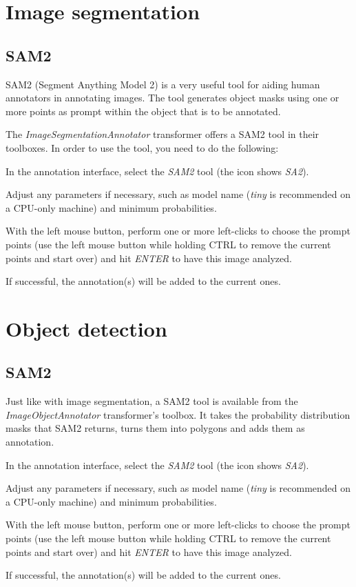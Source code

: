 \documentclass[a4paper]{book}
\begin{document}
\chapter{Image segmentation}
\section{SAM2}
SAM2\cite{sam2} (Segment Anything Model 2) is a very useful tool for aiding human annotators in
annotating images. The tool generates object masks using one or more points as prompt
within the object that is to be annotated.

The \textit{ImageSegmentationAnnotator} transformer offers a SAM2
tool in their toolboxes. In order to use the tool, you need to do the following:

\begin{tight_itemize}
  \item In the annotation interface, select the \textit{SAM2} tool (the icon shows \textit{SA2}).
  \item Adjust any parameters if necessary, such as model name (\textit{tiny} is recommended on a CPU-only machine)
  and minimum probabilities.
  \item With the left mouse button, perform one or more left-clicks to choose the prompt points (use the left mouse
  button while holding CTRL to remove the current points and start over) and hit \textit{ENTER} to have this image analyzed.
  \item If successful, the annotation(s) will be added to the current ones.
\end{tight_itemize}

\chapter{Object detection}
\section{SAM2}
Just like with image segmentation, a SAM2\cite{sam2} tool is available from the \textit{ImageObjectAnnotator}
transformer's toolbox. It takes the probability distribution masks that SAM2 returns, turns them into polygons
and adds them as annotation.

\begin{tight_itemize}
  \item In the annotation interface, select the \textit{SAM2} tool (the icon shows \textit{SA2}).
  \item Adjust any parameters if necessary, such as model name (\textit{tiny} is recommended on a CPU-only machine)
  and minimum probabilities.
  \item With the left mouse button, perform one or more left-clicks to choose the prompt points (use the left mouse
  button while holding CTRL to remove the current points and start over) and hit \textit{ENTER} to have this image analyzed.
  \item If successful, the annotation(s) will be added to the current ones.
\end{tight_itemize}



\end{document}
